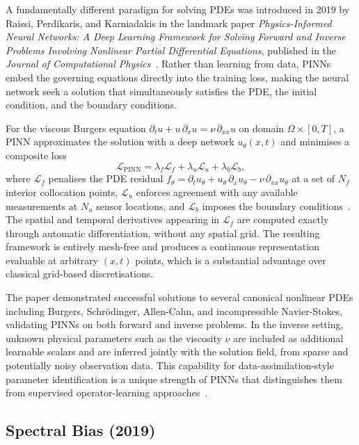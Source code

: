 A fundamentally different paradigm for solving PDEs was introduced in 2019 by Raissi, Perdikaris, and Karniadakis in the landmark paper \emph{Physics-Informed Neural Networks: A Deep Learning Framework for Solving Forward and Inverse Problems Involving Nonlinear Partial Differential Equations}, published in the \emph{Journal of Computational Physics}~\cite{raissi2019physics}. Rather than learning from data, PINNs embed the governing equations directly into the training loss, making the neural network seek a solution that simultaneously satisfies the PDE, the initial condition, and the boundary conditions.

For the viscous Burgers equation $\partial_t u + u\,\partial_x u = \nu\,\partial_{xx} u$ on domain $\Omega \times [0,T]$, a PINN approximates the solution with a deep network $u_\theta(x,t)$ and minimises a composite loss
\begin{equation}
  \mathcal{L}_{\mathrm{PINN}} = \lambda_f \mathcal{L}_f + \lambda_u \mathcal{L}_u + \lambda_b \mathcal{L}_b,
\end{equation}
where $\mathcal{L}_f$ penalises the PDE residual $f_\theta = \partial_t u_\theta + u_\theta\,\partial_x u_\theta - \nu\,\partial_{xx} u_\theta$ at a set of $N_f$ interior collocation points, $\mathcal{L}_u$ enforces agreement with any available measurements at $N_u$ sensor locations, and $\mathcal{L}_b$ imposes the boundary conditions~\cite{raissi2019physics}. The spatial and temporal derivatives appearing in $\mathcal{L}_f$ are computed exactly through automatic differentiation, without any spatial grid. The resulting framework is entirely mesh-free and produces a continuous representation evaluable at arbitrary $(x,t)$ points, which is a substantial advantage over classical grid-based discretisations.

The paper demonstrated successful solutions to several canonical nonlinear PDEs including Burgers, Schrödinger, Allen-Cahn, and incompressible Navier-Stokes, validating PINNs on both forward and inverse problems. In the inverse setting, unknown physical parameters such as the viscosity $\nu$ are included as additional learnable scalars and are inferred jointly with the solution field, from sparse and potentially noisy observation data. This capability for data-assimilation-style parameter identification is a unique strength of PINNs that distinguishes them from supervised operator-learning approaches~\cite{raissi2019physics}.

\subsection{Spectral Bias (2019)}
\label{sec:bg:spectral-bias}

